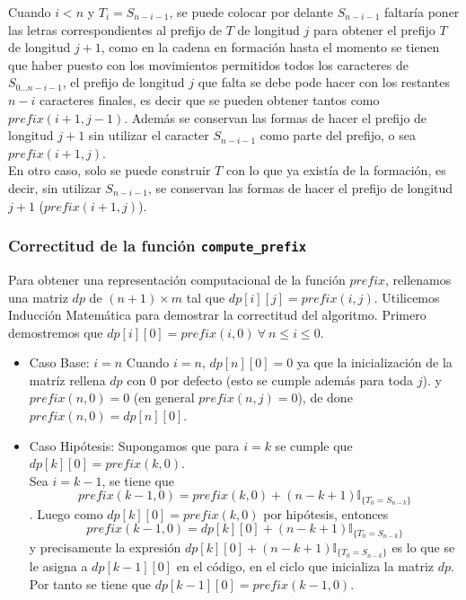\documentclass[a4paper]{article}
\begin{document}
    Cuando $i < n$ y $T_i = S_{n-i-1}$, se puede colocar por delante $S_{n-i-1}$ faltar\'ia poner las letras correspondientes
    al prefijo de $T$ de longitud $j$ para obtener el prefijo $T$ de longitud $j+1$, como en la cadena en formaci\'on hasta el momento se tienen que 
    haber puesto con los movimientos permitidos todos los caracteres de $S_{0... n-i-1}$, el prefijo de longitud $j$ que falta se debe pode hacer con los 
    restantes $n-i$ caracteres finales, es decir que se pueden obtener tantos como $prefix(i+1, j-1)$. Adem\'as se conservan las formas de hacer el prefijo de longitud $j+1$
    sin utilizar el caracter $S_{n-i-1}$ como parte del prefijo, o sea $prefix(i+1,j)$.\\

    En otro caso, solo se puede construir $T$ con lo que ya exist\'ia de la formaci\'on, es decir,
    sin utilizar $S_{n-i-1}$, se conservan las formas de hacer el prefijo de longitud $j+1$ ($prefix(i+1,j)$).

    \subsubsection*{Correctitud de la funci\'on \texttt{compute\_prefix}}

    Para obtener una representaci\'on computacional de la funci\'on $prefix$,
rellenamos una matriz $dp$ de $(n+1) \times m$ tal que $dp[i][j] = prefix(i,j)$. Utilicemos Inducci\'on Matem\'atica 
para demostrar la correctitud del algoritmo. Primero demostremos que $dp[i][0] = prefix(i,0)~\forall~n\leq i \leq 0$. \\


\begin{itemize}
    \item Caso Base: $i = n$
    Cuando $i=n$, $dp[n][0] = 0$ ya que la inicializaci\'on de la matr\'iz rellena $dp$ con $0$ por defecto (esto se cumple adem\'as para toda $j$). 
    y  $prefix(n,0)=0$ (en general $prefix(n,j) = 0$), de done $prefix(n,0)= dp[n][0]$.

    \item Caso Hip\'otesis: Supongamos que para $i = k$ se cumple que $dp[k][0] = prefix(k,0)$.\\ 
    
    Sea $i = k-1$, se tiene que $$prefix(k-1,0) = prefix(k,0) + (n-k+1)\mathbb{I}_{\{ T_0 = S_{n-k}\}}$$.
    Luego como $dp[k][0] = prefix(k,0)$ por hip\'otesis, entonces 
    $$prefix(k-1,0) = dp[k][0] + (n-k+1)\mathbb{I}_{\{ T_0 = S_{n-k}\}}$$ y precisamente la expresi\'on 
    $dp[k][0] + (n-k+1)\mathbb{I}_{\{ T_0 = S_{n-k}\}} $ es lo que se le asigna a $dp[k-1][0]$ en el c\'odigo, en el ciclo que 
    inicializa la matriz $dp$. Por tanto se tiene que $dp[k-1][0] = prefix(k-1,0)$.

\end{itemize}
\end{document}
